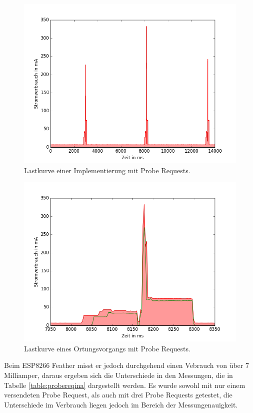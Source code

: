 \begin{figure}[h!]
  \centering
	\includegraphics[width=\textwidth]{plots/probereqfull.png}
  \caption{Lastkurve einer Implementierung mit Probe Requests.}
  \label{fig:probereqfull}
\end{figure}

\begin{figure}[h!]
  \centering
	\includegraphics[width=\textwidth]{plots/probereqv.png}
  \caption{Lastkurve eines Ortungsvorgangs mit Probe Requests.}
  \label{fig:probereqv}
\end{figure}

Beim ESP8266 Feather misst er jedoch durchgehend einen Vebrauch von über 7 Milliamper, daraus ergeben sich die Unterschiede in den Messungen, die in Tabelle \ref{table:probereqina} dargestellt werden.
Es wurde sowohl mit nur einem versendeten Probe Request, als auch mit drei Probe Requests getestet, die Unterschiede im Verbrauch liegen jedoch im Bereich der Messungenauigkeit.

